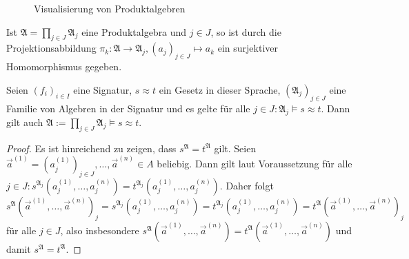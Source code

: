 \begin{figure}[H]
    \caption{Visualisierung von Produktalgebren}
    \label{fig:produktalgebra}
\end{figure}

\begin{remark}
    Ist $\mathfrak{A}=\prod_{j\in J}\mathfrak{A}_j$ eine Produktalgebra und $j\in J$, so ist durch die Projektionsabbildung
    $\pi_k:\mathfrak{A}\to \mathfrak{A}_j, (a_j)_{j \in J}\mapsto a_k$ ein surjektiver Homomorphismus gegeben.
\end{remark}

\begin{proposition}
    Seien $(f_i)_{i\in I}$ eine Signatur, $s\approx t$ ein Gesetz in dieser Sprache, $(\mathfrak{A}_j)_{j\in J}$
    eine Familie von Algebren in der Signatur und es gelte für alle $j\in J:\mathfrak{A}_j\models s\approx t$.
    Dann gilt auch $\mathfrak{A}:=\prod_{j\in J}\mathfrak{A}_j\models s\approx t$.
\end{proposition}

\begin{proof}
    Es ist hinreichend zu zeigen, dass $s^\mathfrak{A}=t^\mathfrak{A}$ gilt. Seien $\vec a^{(1)} = (a_j^{(1)})_{j \in J}, \ldots,\vec a^{(n)}\in A$ beliebig.
    Dann gilt laut Voraussetzung für alle $j\in J:s^{\mathfrak{A}_j}(a^{(1)}_j,\ldots,a^{(n)}_j) = t^{\mathfrak{A}_j}(a^{(1)}_j,\ldots,a^{(n)}_j)$.
    Daher folgt $s^\mathfrak{A}(\vec a^{(1)},\ldots,\vec a^{(n)})_j=s^{\mathfrak{A}_j}(a^{(1)}_j,\ldots,a^{(n)}_j) = t^{\mathfrak{A}_j}(a^{(1)}_j,\ldots,a^{(n)}_j)=t^\mathfrak{A}(\vec a^{(1)},\ldots,\vec a^{(n)})_j$
    für alle $j\in J$, also insbesondere $s^\mathfrak{A}(\vec a^{(1)},\ldots,\vec a^{(n)})=t^\mathfrak{A}(\vec a^{(1)},\ldots,\vec a^{(n)})$ und damit $s^\mathfrak{A}=t^\mathfrak{A}.$
\end{proof}

